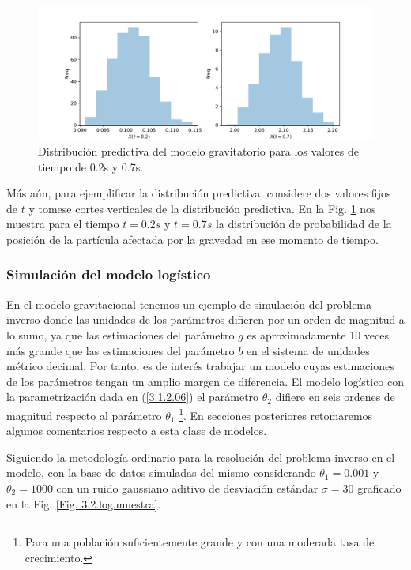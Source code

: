 \begin{figure}[H]
    \centering 
    \includegraphics[width = 15 cm]{img/Exp_Central_gravedad_sigma/Figuras/Generales/TiempoFijo_gravedad_sigma.png} 
    \caption{Distribución predictiva del modelo gravitatorio para los valores de tiempo de 0.2s y 0.7s.}
    \label{Fig. 3.2.2.07}
\end{figure} 

Más aún, para ejemplificar la distribución predictiva, considere dos valores fijos de $t$ y tomese cortes verticales de la distribución predictiva. En la Fig. \ref{Fig. 3.2.2.07} nos muestra para el tiempo $t = 0.2 s$ y $t = 0.7s$ la distribución de probabilidad de la posición de la partícula afectada por la gravedad en ese momento de tiempo. 

\subsubsection{Simulación del modelo logístico}

En el modelo gravitacional tenemos un ejemplo de simulación del problema inverso donde las unidades de los parámetros difieren por un orden de magnitud a lo sumo, ya que las estimaciones del parámetro $g$ es aproximadamente 10 veces más grande que las estimaciones del parámetro $b$ en el sistema de unidades métrico decimal. Por tanto, es de interés trabajar un modelo cuyas estimaciones de los parámetros tengan un amplio margen de diferencia. El modelo logístico con la parametrización dada en (\ref{3.1.2.06}) el parámetro $\theta_2$ difiere en seis ordenes de magnitud respecto al parámetro $\theta_1$ \footnote{Para una población suficientemente grande y con una moderada tasa de crecimiento.}. En secciones posteriores retomaremos algunos comentarios respecto a esta clase de modelos.

Siguiendo la metodología ordinario para la resolución del problema inverso en el modelo, con la base de datos simuladas del mismo considerando $\theta_1 = 0.001$ y $\theta_2 = 1000$ con un ruido gaussiano aditivo de desviación estándar $\sigma = 30$ graficado en la Fig. \ref{Fig. 3.2.log.muestra}.

